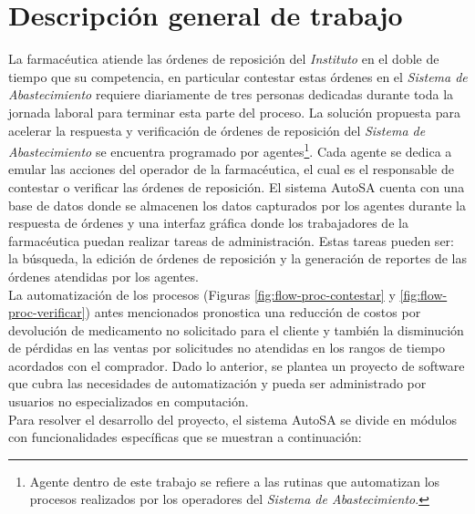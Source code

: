 \section{Descripción general de trabajo}\label{sec:desc-general}
La farmacéutica atiende las órdenes de reposición del \textit{Instituto} en el doble de tiempo que su competencia, en particular contestar estas órdenes en el \textit{Sistema de Abastecimiento} requiere diariamente de tres personas dedicadas durante toda la jornada laboral para terminar esta parte del proceso. La solución propuesta para acelerar la respuesta y verificación de órdenes de reposición del \textit{Sistema de Abastecimiento} se encuentra programado por agentes\footnote{Agente dentro de este trabajo se refiere a las rutinas que automatizan los procesos realizados por los operadores del \textit{Sistema de Abastecimiento}.}. Cada agente se dedica a emular las acciones del operador de la farmacéutica, el cual es el responsable de contestar o verificar las órdenes de reposición. El sistema AutoSA cuenta con una base de datos donde se almacenen los datos capturados por los agentes durante la respuesta de órdenes y una interfaz gráfica donde los trabajadores de la farmacéutica puedan realizar tareas de administración. Estas tareas pueden ser: la búsqueda, la edición de órdenes de reposición y la generación de reportes de las órdenes atendidas por los agentes.\\
La automatización de los procesos (Figuras \ref{fig:flow-proc-contestar} y \ref{fig:flow-proc-verificar}) antes mencionados pronostica una reducción de costos por devolución de medicamento no solicitado para el cliente y también la disminución de pérdidas en las ventas por solicitudes no atendidas en los rangos de tiempo acordados con el comprador. Dado lo anterior, se plantea un proyecto de software que cubra las necesidades de automatización y pueda ser administrado por usuarios no especializados en computación.\\
Para resolver el desarrollo del proyecto, el sistema AutoSA se divide en módulos con funcionalidades específicas que se muestran a continuación:
\pagebreak
